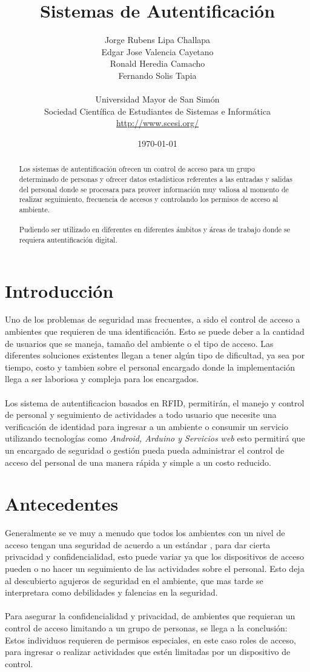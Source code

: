 \documentclass[11pt,twocolumn]{article}
\title{
\vspace{-3cm}   
Sistemas de Autentificaci\'on
}
\author{ 
Jorge Rubens Lipa Challapa\\
Edgar Jose Valencia Cayetano\\
Ronald Heredia Camacho\\
Fernando Solis Tapia\\
\\
Universidad Mayor de San Sim\'on \\
Sociedad Cient\'ifica de Estudiantes de Sistemas e Inform\'atica\\
\url {http://www.scesi.org/}
}
\date{ \today }
\begin{document}
\maketitle

\begin{abstract} 
Los sistemas de autentificaci\'on ofrecen un control de 
acceso para un grupo determinado de personas y ofrecer datos estad\'isticos 
referentes a las entradas y salidas del personal donde se procesara para 
proveer informaci\'on muy valiosa al momento de realizar seguimiento, 
frecuencia de accesos y controlando los permisos de acceso al ambiente.\\
\\
 Pudiendo ser utilizado en diferentes en diferentes \'ambitos y \'areas de
 trabajo donde se requiera autentificaci\'on digital.
\end{abstract}

\section{Introducci\'on}
Uno de los problemas de seguridad mas frecuentes,  a sido el control de acceso 
a ambientes que requieren de una identificaci\'on. Esto se puede deber a  la 
cantidad de usuarios que se maneja, tama\~no del ambiente o el tipo de acceso. 
Las diferentes soluciones existentes llegan a tener alg\'un tipo de dificultad, 
ya sea por tiempo, costo y tambien sobre el personal encargado donde la 
implementaci\'on llega a ser laboriosa y compleja para los encargados.\\
\\
Los sistema de autentificacion basados en RFID, 
permitir\'an, el manejo y control de personal y seguimiento de actividades a
 todo usuario que necesite una verificaci\'on de identidad para ingresar a un
 ambiente o consumir un servicio utilizando tecnolog\'ias como \textit{Android,
 Arduino y Servicios web} esto permitir\'a que un encargado de seguridad o 
gesti\'on pueda pueda administrar el control de acceso del personal de una 
manera r\'apida y simple a un costo reducido.\\

\section{Antecedentes}

Generalmente se ve muy a menudo que todos los ambientes  con un nivel de acceso 
tengan una seguridad de acuerdo a un est\'andar , para dar cierta privacidad y 
confidencialidad, esto puede variar ya que los dispositivos de acceso pueden o 
no hacer un seguimiento de las actividades sobre el personal. Esto deja al 
descubierto agujeros de seguridad en el ambiente, que mas tarde se interpretara 
como debilidades y falencias en la seguridad.\\
\\
Para asegurar la confidencialidad y privacidad, de ambientes que requieran un 
control de acceso limitando a un grupo de personas, se llega a la conclusi\'on: 
Estos individuos  requieren de permisos especiales, en este caso roles de 
acceso, para ingresar o realizar actividades que est\'en limitadas por un 
dispositivo de control. \\
\end{document}
